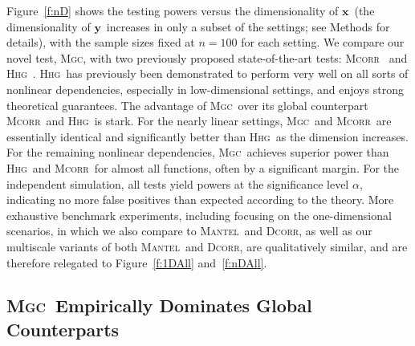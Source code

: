 \documentclass[11pt]{article}
\providecommand{\sct}[1]{{\normalfont\textsc{#1}}}
\providecommand{\mb}[1]{\boldsymbol{#1}}
\newcommand{\Mgc}{\sct{Mgc}}
\newcommand{\Hhg}{\sct{Hhg}}
\newcommand{\Dcorr}{\sct{Dcorr}}
\newcommand{\Mcorr}{\sct{Mcorr}}
\newcommand{\Mantel}{\sct{Mantel}}
\newcommand{\mbx}{\ensuremath{\mb{x}}}
\newcommand{\mby}{\ensuremath{\mb{y}}}
\begin{document}
Figure~\ref{f:nD} shows the testing powers versus the dimensionality of \mbx~(the dimensionality of \mby~increases in only a subset of the settings; see Methods for details), with the sample sizes fixed at $n=100$ for each setting.  We compare  our novel test, \Mgc, with two previously proposed state-of-the-art tests: \Mcorr~\cite{SzekelyRizzo2013a} and \Hhg~\cite{HellerGorfine2013}.  \Hhg~has previously been demonstrated to perform very well on all sorts of nonlinear dependencies, especially in low-dimensional settings, and enjoys strong theoretical guarantees. 
% 
The advantage of \Mgc~over its global counterpart \Mcorr~and \Hhg~is  stark. For the nearly linear settings, \Mgc~and \Mcorr~are essentially identical and significantly better than \Hhg~as the dimension increases.  For the remaining nonlinear dependencies, \Mgc~achieves superior power than \Hhg~and \Mcorr~for almost all functions, often by a significant margin.  For the independent simulation, all tests yield powers at the significance level $\alpha$,  indicating no more false positives than expected according to the theory.
More exhaustive benchmark experiments, including focusing on the one-dimensional scenarios,
in which we also compare to \Mantel~and \Dcorr, 
as well as our  multiscale variants of both \Mantel~and \Dcorr, 
 are qualitatively similar, and are therefore relegated to Figure~\ref{f:1DAll} and~\ref{f:nDAll}.



\subsection*{\Mgc~Empirically Dominates Global Counterparts}
\end{document}
